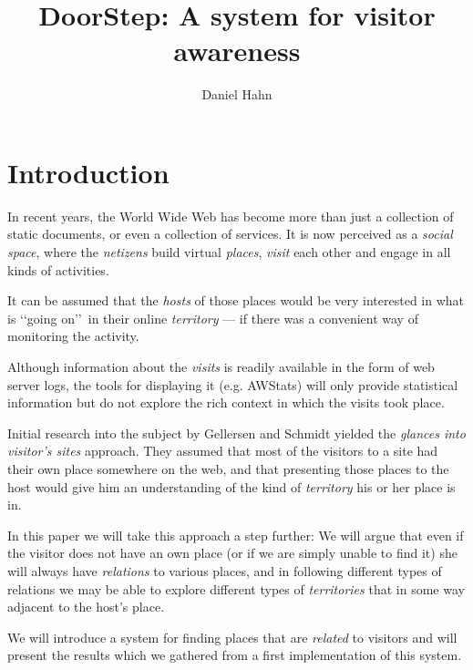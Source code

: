 \documentclass[a4paper]{danarticle}
\begin{document}
  \author{Daniel Hahn}
  \title{DoorStep: A system for visitor awareness}
  \maketitle
  
  \section*{Introduction}
    In recent years, the World Wide Web has become more than just a collection
    of static documents, or even a collection of services. It is now perceived
    as a \textit{social space}, where the \textit{netizens} build virtual
    \textit{places}, \textit{visit} each other and engage in all kinds of
    activities.
    
    It can be assumed that the \textit{hosts} of those places would be
    very interested in what is \lq\lq going on\rq\rq\ in their online
    \textit{territory} --- if
    there was a convenient way of monitoring the activity. 
    
    Although
    information about the \textit{visits} is readily available in the
    form of web server logs, the tools for displaying it (e.g. AWStats) will only
    provide statistical information but do not explore the rich context in which
    the visits took place. 
    
    Initial research into the subject by Gellersen and Schmidt\cite{webaware}
    yielded the
    \textit{glances into visitor's sites} approach. They assumed that most of
    the visitors to a site had their own place somewhere on the web, and that
    presenting those places to the host would give him an understanding of the
    kind of \textit{territory} his or her place is in.
    
    In this paper we will take this approach a step further: We will argue that
    even if the visitor does not have an own place (or if we are
    simply unable to find it) she will always have \textit{relations} to various
    places, and in following different types of relations we may be able to
    explore different types of \textit{territories} that in some way adjacent to
    the host's place.
    
    We will introduce a system for finding places that are \textit{related} to
    visitors and will present the results which we gathered from a first
    implementation of this system.
\end{document}
